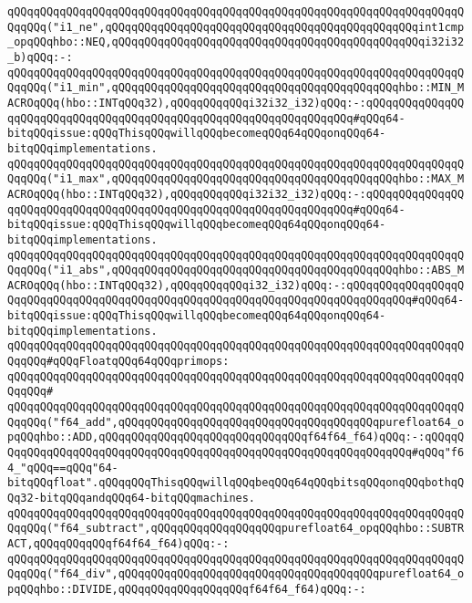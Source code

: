\verb|qQQqqQQqqQQqqQQqqQQqqQQqqQQqqQQqqQQqqQQqqQQqqQQqqQQqqQQqqQQqqQQqqQQqqQQqqQQq("i1_ne",qQQqqQQqqQQqqQQqqQQqqQQqqQQqqQQqqQQqqQQqqQQqqQQqint1cmp_opqQQqhbo::NEQ,qQQqqQQqqQQqqQQqqQQqqQQqqQQqqQQqqQQqqQQqqQQqqQQqi32i32_b)qQQq:-:|\newline
\newline
\verb|qQQqqQQqqQQqqQQqqQQqqQQqqQQqqQQqqQQqqQQqqQQqqQQqqQQqqQQqqQQqqQQqqQQqqQQqqQQq("i1_min",qQQqqQQqqQQqqQQqqQQqqQQqqQQqqQQqqQQqqQQqqQQqhbo::MIN_MACROqQQq(hbo::INTqQQq32),qQQqqQQqqQQqi32i32_i32)qQQq:-:qQQqqQQqqQQqqQQqqQQqqQQqqQQqqQQqqQQqqQQqqQQqqQQqqQQqqQQqqQQqqQQqqQQq#qQQq64-bitqQQqissue:qQQqThisqQQqwillqQQqbecomeqQQq64qQQqonqQQq64-bitqQQqimplementations.|\newline
\verb|qQQqqQQqqQQqqQQqqQQqqQQqqQQqqQQqqQQqqQQqqQQqqQQqqQQqqQQqqQQqqQQqqQQqqQQqqQQq("i1_max",qQQqqQQqqQQqqQQqqQQqqQQqqQQqqQQqqQQqqQQqqQQqhbo::MAX_MACROqQQq(hbo::INTqQQq32),qQQqqQQqqQQqi32i32_i32)qQQq:-:qQQqqQQqqQQqqQQqqQQqqQQqqQQqqQQqqQQqqQQqqQQqqQQqqQQqqQQqqQQqqQQqqQQq#qQQq64-bitqQQqissue:qQQqThisqQQqwillqQQqbecomeqQQq64qQQqonqQQq64-bitqQQqimplementations.|\newline
\verb|qQQqqQQqqQQqqQQqqQQqqQQqqQQqqQQqqQQqqQQqqQQqqQQqqQQqqQQqqQQqqQQqqQQqqQQqqQQq("i1_abs",qQQqqQQqqQQqqQQqqQQqqQQqqQQqqQQqqQQqqQQqqQQqhbo::ABS_MACROqQQq(hbo::INTqQQq32),qQQqqQQqqQQqi32_i32)qQQq:-:qQQqqQQqqQQqqQQqqQQqqQQqqQQqqQQqqQQqqQQqqQQqqQQqqQQqqQQqqQQqqQQqqQQqqQQqqQQqqQQq#qQQq64-bitqQQqissue:qQQqThisqQQqwillqQQqbecomeqQQq64qQQqonqQQq64-bitqQQqimplementations.|\newline
\newline
\verb|qQQqqQQqqQQqqQQqqQQqqQQqqQQqqQQqqQQqqQQqqQQqqQQqqQQqqQQqqQQqqQQqqQQqqQQqqQQq#qQQqFloatqQQq64qQQqprimops:|\newline
\verb|qQQqqQQqqQQqqQQqqQQqqQQqqQQqqQQqqQQqqQQqqQQqqQQqqQQqqQQqqQQqqQQqqQQqqQQqqQQq#|\newline
\verb|qQQqqQQqqQQqqQQqqQQqqQQqqQQqqQQqqQQqqQQqqQQqqQQqqQQqqQQqqQQqqQQqqQQqqQQqqQQq("f64_add",qQQqqQQqqQQqqQQqqQQqqQQqqQQqqQQqqQQqqQQqpurefloat64_opqQQqhbo::ADD,qQQqqQQqqQQqqQQqqQQqqQQqqQQqqQQqf64f64_f64)qQQq:-:qQQqqQQqqQQqqQQqqQQqqQQqqQQqqQQqqQQqqQQqqQQqqQQqqQQqqQQqqQQqqQQqqQQq#qQQq"f64_"qQQq==qQQq"64-bitqQQqfloat".qQQqqQQqThisqQQqwillqQQqbeqQQq64qQQqbitsqQQqonqQQqbothqQQq32-bitqQQqandqQQq64-bitqQQqmachines.|\newline
\verb|qQQqqQQqqQQqqQQqqQQqqQQqqQQqqQQqqQQqqQQqqQQqqQQqqQQqqQQqqQQqqQQqqQQqqQQqqQQq("f64_subtract",qQQqqQQqqQQqqQQqqQQqpurefloat64_opqQQqhbo::SUBTRACT,qQQqqQQqqQQqf64f64_f64)qQQq:-:|\newline
\verb|qQQqqQQqqQQqqQQqqQQqqQQqqQQqqQQqqQQqqQQqqQQqqQQqqQQqqQQqqQQqqQQqqQQqqQQqqQQq("f64_div",qQQqqQQqqQQqqQQqqQQqqQQqqQQqqQQqqQQqqQQqpurefloat64_opqQQqhbo::DIVIDE,qQQqqQQqqQQqqQQqqQQqf64f64_f64)qQQq:-:|\newline
